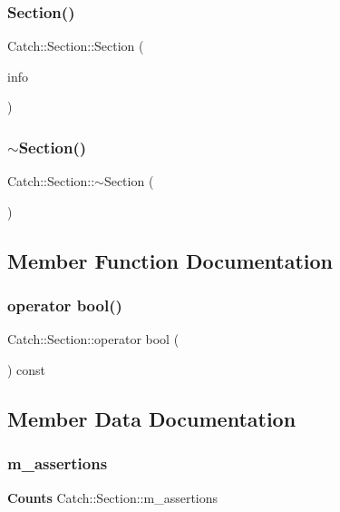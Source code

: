 \subsubsection{Section()}
{\footnotesize\ttfamily Catch\+::\+Section\+::\+Section (\begin{DoxyParamCaption}\item[{\textbf{ Section\+Info} const \&}]{info }\end{DoxyParamCaption})}

\mbox{\label{class_catch_1_1_section_aa1422edd68a77aa578b5cc6b8b69f86f}} 
\subsubsection{$\sim$Section()}
{\footnotesize\ttfamily Catch\+::\+Section\+::$\sim$\+Section (\begin{DoxyParamCaption}{ }\end{DoxyParamCaption})}



\subsection{Member Function Documentation}
\mbox{\label{class_catch_1_1_section_a0632b804dcea1417a2970620a9742eb3}} 
\subsubsection{operator bool()}
{\footnotesize\ttfamily Catch\+::\+Section\+::operator bool (\begin{DoxyParamCaption}{ }\end{DoxyParamCaption}) const\hspace{0.3cm}{\ttfamily [explicit]}}



\subsection{Member Data Documentation}
\mbox{\label{class_catch_1_1_section_ae0a2acc394d4bd1bc7a51a1445d25034}} 
\subsubsection{m\_assertions}
{\footnotesize\ttfamily \textbf{ Counts} Catch\+::\+Section\+::m\+\_\+assertions\hspace{0.3cm}{\ttfamily [private]}}

